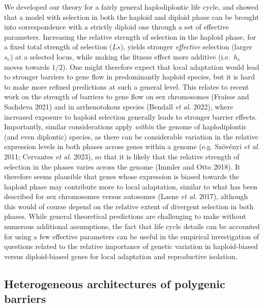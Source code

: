 \documentclass[
  11pt,
]{article}
\begin{document}
We developed our theory for a fairly general haplodiplontic life cycle,
and showed that a model with selection in both the haploid and diploid
phase can be brought into correspondence with a strictly diploid one
through a set of effective parameters. Increasing the relative strength
of selection in the haploid phase, for a fixed total strength of
selection (\(Ls\)), yields stronger \emph{effective} selection (larger
\(s_e\)) at a selected locus, while making the fitness effect more
additive (i.e.~\(h_e\) moves towards \(1/2\)). One might therefore
expect that local adaptation would lead to stronger barriers to gene
flow in predominantly haploid species, but it is hard to make more
refined predictions at such a general level. This relates to recent work
on the strength of barriers to gene flow on sex chromosomes (Fraïsse and
Sachdeva 2021) and in arrhenotokous species (Bendall \emph{et al.}
2022), where increased exposure to haploid selection generally leads to
stronger barrier effects. Importantly, similar considerations apply
\emph{within} the genome of haplodiplontic (and even diplontic) species,
as there can be considerable variation in the relative expression levels
in both phases across genes within a genome (e.g. Szövényi \emph{et al.}
2011; Cervantes \emph{et al.} 2023), so that it is likely that the
relative strength of selection in the phases varies across the genome
(Immler and Otto 2018). It therefore seems plausible that genes whose
expression is biased towards the haploid phase may contribute more to
local adaptation, similar to what has been described for sex chromosomes
versus autosomes (Lasne \emph{et al.} 2017), although this would of
course depend on the relative extent of divergent selection in both
phases. While general theoretical predictions are challenging to make
without numerous additional assumptions, the fact that life cycle
details can be accounted for using a few effective parameters can be
useful in the empirical investigation of questions related to the
relative importance of genetic variation in haploid-biased versus
diploid-biased genes for local adaptation and reproductive isolation.

\hypertarget{heterogeneous-architectures-of-polygenic-barriers}{%
\subsection{Heterogeneous architectures of polygenic
barriers}\label{heterogeneous-architectures-of-polygenic-barriers}}
\end{document}
